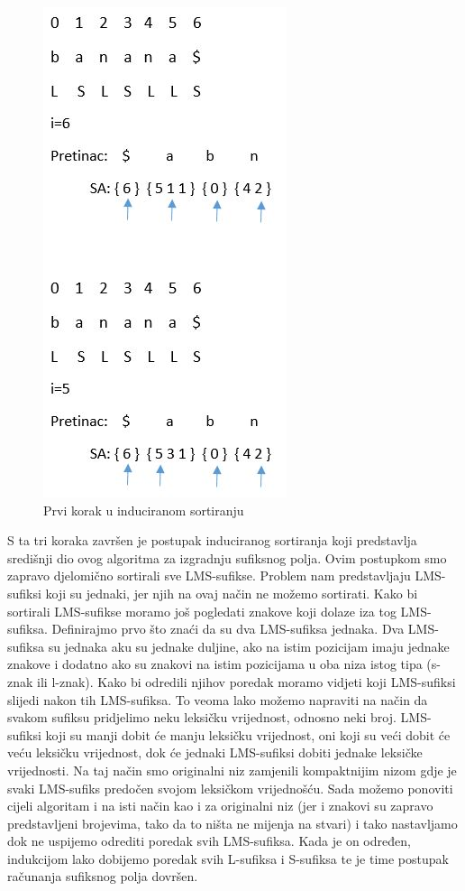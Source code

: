 \begin{figure}[H]
   \centering
       \includegraphics{./pictures/SAISstep3.jpg}
 \caption{Prvi korak u induciranom sortiranju}
 \label{fig:sais3}
\end{figure}

S ta tri koraka završen je postupak induciranog sortiranja koji predstavlja središnji dio ovog algoritma za izgradnju sufiksnog polja. Ovim postupkom smo zapravo djelomično sortirali sve LMS-sufikse. Problem nam predstavljaju LMS-sufiksi koji su jednaki, jer njih na ovaj način ne možemo sortirati. Kako bi sortirali LMS-sufikse moramo još pogledati znakove koji dolaze iza tog LMS-sufiksa. Definirajmo prvo što znaći da su dva LMS-sufiksa jednaka. Dva LMS-sufiksa su jednaka aku su jednake duljine, ako na istim pozicijam imaju jednake znakove i dodatno ako su znakovi na istim pozicijama u oba niza istog tipa (s-znak ili l-znak). Kako bi odredili njihov poredak moramo vidjeti koji LMS-sufiksi slijedi nakon tih LMS-sufiksa. To veoma lako možemo napraviti na način da svakom sufiksu pridjelimo neku leksičku vrijednost, odnosno neki broj. LMS-sufiksi koji su manji dobit će manju leksičku vrijednost, oni koji su veći dobit će veću leksičku vrijednost, dok će jednaki LMS-sufiksi dobiti jednake leksičke vrijednosti. Na taj način smo originalni niz zamjenili kompaktnijim nizom gdje je svaki LMS-sufiks predočen svojom leksičkom vrijednošću. Sada možemo ponoviti cijeli algoritam i na isti način kao i za originalni niz (jer i znakovi su zapravo predstavljeni brojevima, tako da to ništa ne mijenja na stvari) i tako nastavljamo dok ne uspijemo odrediti poredak svih LMS-sufiksa. Kada je on određen, indukcijom lako dobijemo poredak svih L-sufiksa i S-sufiksa te je time postupak računanja sufiksnog polja dovršen.

